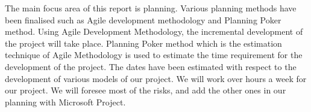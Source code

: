 The main focus area of this report is planning. Various planning methods have been finalised such as Agile development methodology and Planning Poker method.
Using Agile Development Methodology, the incremental  development of the project will take place. Planning Poker method  which is the estimation technique of Agile Methodology is used to estimate the time requirement for the development of the project. The dates have been estimated with respect to the development of various models of our project. We will work over hours a week for our project. We will foresee most of the risks, and add the other ones in our planning with Microsoft Project. 